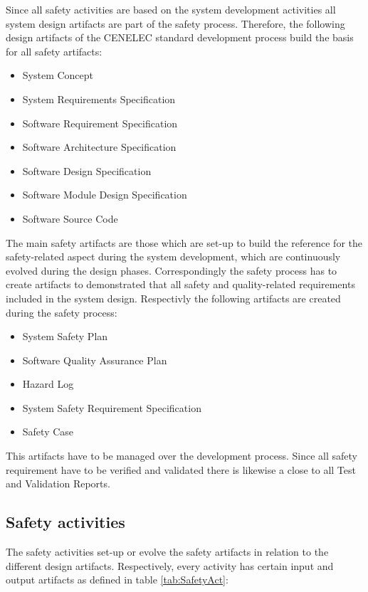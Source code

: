 \documentclass{template/openetcs_article}
\begin{document}
Since all safety activities are based on the system development activities all system design artifacts are part of the safety process. Therefore, the following design artifacts of the CENELEC standard development process build the basis for all safety artifacts:

\begin{itemize}
\item System Concept
\item System Requirements Specification
\item Software Requirement Specification
\item Software Architecture Specification
\item Software Design Specification
\item Software Module Design Specification
\item Software Source Code
\end{itemize}

The main safety artifacts are those which are set-up to build the reference for the safety-related aspect during the system development, which are continuously evolved during the design phases. Correspondingly the safety process has to create artifacts to demonstrated that all safety and quality-related requirements included in the system design. Respectivly the following artifacts are created during the safety process:

\begin{itemize}
\item System Safety Plan
\item Software Quality Assurance Plan
\item Hazard Log
\item System Safety Requirement Specification
\item Safety Case
\end{itemize} 

This artifacts have to be managed over the development process. Since all safety requirement have to be verified and validated there is likewise a close to all Test and Validation Reports.

\subsection{Safety activities}

The safety activities set-up or evolve the safety artifacts in relation to the different design artifacts. Respectively, every activity has certain input and output artifacts as defined in table \ref{tab:SafetyAct}:
\end{document}
